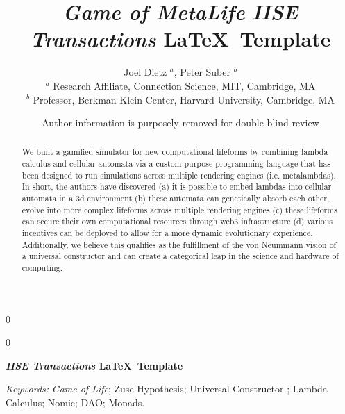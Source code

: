 \documentclass[11pt]{article}
\newcommand{\blind}{0}
\begin{document}
	    \graphicspath{ {./} }
	
		\def\spacingset#1{\renewcommand{\baselinestretch}%
			{#1}\small\normalsize} \spacingset{1}
		
		\blind
		{
			\title{\bf \emph{Game of MetaLife }  }
			\author{Joel Dietz $^a$, Peter Suber  $^b$ \\
			$^a$ Research Affiliate, Connection Science, MIT, Cambridge, MA \\
             $^b$ Professor, Berkman Klein Center, Harvard University, Cambridge, MA }
			\date{}
			\maketitle
		} \fi
		
		\blind
		{

            \title{\bf \emph{IISE Transactions} \LaTeX \ Template}
			\author{Author information is purposely removed for double-blind review}
			
\bigskip
			\bigskip
			\bigskip
			\begin{center}
				{\LARGE\bf \emph{IISE Transactions} \LaTeX \ Template}
			\end{center}
			\medskip
		} \fi
		\bigskip
		
	\begin{abstract}
We built a gamified simulator for new computational lifeforms by combining lambda calculus and cellular automata via a custom purpose programming language that has been designed to run simulations across multiple rendering engines (i.e. metalambdas). In short, the authors have discovered (a) it is possible to embed lambdas into cellular automata in a 3d environment (b) these automata can genetically absorb each other, evolve into more complex lifeforms across multiple rendering engines (c) these lifeforms can secure their own computational resources through web3 infrastructure (d) various incentives can be deployed to allow for a more dynamic evolutionary experience. Additionally, we believe this qualifies as the fulfillment of the von Neummann vision of a universal constructor and can create a categorical leap in the science and hardware of computing. 

	\end{abstract}
			
	\noindent%
	{\it Keywords:} \emph{Game of Life}; {Zuse Hypothesis}; 
Universal Constructor ; Lambda Calculus; Nomic; DAO; Monads.
\end{document}
